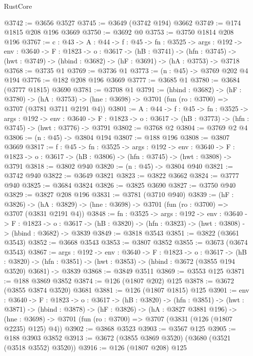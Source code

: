 \begin{lexlean}{RustCore}
\begin{coremodule}
@3742 := @3656 @3527
@3745 := @3649 (@3742 @194) @3662
@3749 := @174 @1815 @208 @196 @3669
@3750 := @3692 @0
@3753 := @3750 @1814 @208 @196
@3767 := {c : @43} ->
  {A : @44} ->
  {f : @45} ->
  {fn : @3525} ->
  {args : @192} ->
  {env : @3640} ->
  {F : @1823} ->
  {o : @3617} ->
  (hB : @3741) ->
  (hfn : @3745) -> (hwt : @3749) -> (hbind : @3682) -> (hF : @3691) -> (hA : @3753) -> @3718
@3768 := @3735 @1
@3769 := @3736 @1
@3773 := (n : @45) -> @3769 @202 @4 @194
@3776 := @182 @208 @196 @3669
@3777 := @3685 @1
@3780 := @3684 (@3777 @1815) @3690
@3781 := @3708 @1
@3791 := (hbind : @3682) ->
  (hF : @3780) ->
  (hA : @3753) -> (hne : @3698) -> @3701 (fun (ro : @3700) => @3707 (@3781 @3711 @2191 @4))
@3801 := {A : @44} ->
  {f : @45} ->
  {fn : @3525} ->
  {args : @192} ->
  {env : @3640} ->
  {F : @1823} -> {o : @3617} -> (hB : @3773) -> (hfn : @3745) -> (hwt : @3776) -> @3791
@3802 := @3768 @2
@3804 := @3769 @2 @4
@3806 := (n : @45) -> @3804 @194
@3807 := @188 @196
@3808 := @3807 @3669
@3817 := {f : @45} ->
  {fn : @3525} ->
  {args : @192} ->
  {env : @3640} ->
  {F : @1823} -> {o : @3617} -> (hB : @3806) -> (hfn : @3745) -> (hwt : @3808) -> @3791
@3818 := @3802 @940
@3820 := (n : @45) -> @3804 @940
@3821 := @3742 @940
@3822 := @3649 @3821
@3823 := @3822 @3662
@3824 := @3777 @940
@3825 := @3684 @3824
@3826 := @3825 @3690
@3827 := @3750 @940
@3829 := @3827 @208 @196
@3831 := @3781 (@3710 @940)
@3839 := (hF : @3826) ->
  (hA : @3829) -> (hne : @3698) -> @3701 (fun (ro : @3700) => @3707 (@3831 @2191 @4))
@3848 := {fn : @3525} ->
  {args : @192} ->
  {env : @3640} ->
  {F : @1823} ->
  {o : @3617} -> (hB : @3820) -> (hfn : @3823) -> (hwt : @3808) -> (hbind : @3682) -> @3839
@3849 := @3818 @3543
@3851 := @3822 (@3661 @3543)
@3852 := @3668 @3543
@3853 := @3807 @3852
@3855 := @3673 (@3674 @3543)
@3867 := {args : @192} ->
  {env : @3640} ->
  {F : @1823} ->
  {o : @3617} ->
  (hB : @3820) ->
  (hfn : @3851) -> (hwt : @3853) -> (hbind : @3672 (@3855 @194 @3520) @3681) -> @3839
@3868 := @3849 @3511
@3869 := @3553 @125
@3871 := @188 @3869 @3852
@3874 := @126 (@1807 @202) @125
@3878 := @3672 (@3855 @3874 @3520) @3681
@3881 := @126 (@1807 @1815) @125
@3901 := {env : @3640} ->
  {F : @1823} ->
  {o : @3617} ->
  (hB : @3820) ->
  (hfn : @3851) ->
  (hwt : @3871) ->
  (hbind : @3878) ->
  (hF : @3826) ->
  (hA : @3827 @3881 @196) ->
  (hne : @3698) -> @3701 (fun (ro : @3700) => @3707 (@3831 (@126 (@1807 @2235) @125) @4))
@3902 := @3868 @3523
@3903 := @3567 @125
@3905 := @188 @3903 @3852
@3913 := @3672 (@3855 @3869 @3520) (@3680 (@3521 (@3518 @3552) @3520))
@3916 := @126 (@1807 @208) @125

\end{coremodule}
\end{lexlean}
